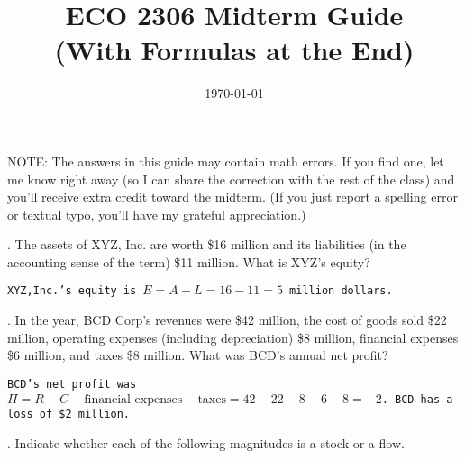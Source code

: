 \documentclass[12pt]{article}
\begin{document}
 

\title{ECO 2306 Midterm Guide\\
(With Formulas at the End)}
\date{\today}

\maketitle

NOTE: The answers in this guide may contain math errors.  If you find one, let me know right away (so I can share the correction with the rest of the class) and you'll receive extra credit toward the midterm.  (If you just report a spelling error or textual typo, you'll have my grateful appreciation.)

\vspace{16pt}

. The assets of XYZ, Inc. are worth \$16 million and its liabilities (in the accounting sense of the term) \$11 million.  What is XYZ's equity?

\vspace{10pt}


\texttt{XYZ,Inc.'s equity is $E = A - L = 16 - 11 = 5$ million dollars.}

\vspace{12pt}


. In the year, BCD Corp's revenues were \$42 million, the cost of goods sold \$22 million, operating expenses (including depreciation) \$8 million, financial expenses \$6 million, and taxes \$8 million.  What was BCD's annual net profit?

\vspace{10pt}

\texttt{BCD's net profit was $\Pi = R - C - \textrm{financial expenses} - \textrm{taxes} = 42-22-8-6-8= -2$.  BCD has a loss of \$2 million.}

\vspace{12pt}

. Indicate whether each of the following magnitudes is a stock or a flow.\\
\end{document}
